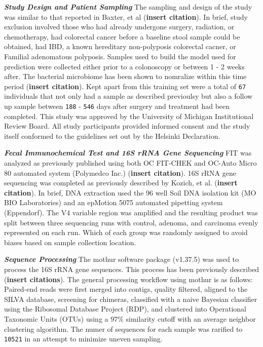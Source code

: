 \documentclass[12pt,]{article}
\begin{document}
\textbf{\emph{Study Design and Patient Sampling}} The sampling and
design of the study was similar to that reported in Baxter, et al
(\textbf{insert citation}). In brief, study exclusion involved those who
had already undergone surgery, radiation, or chemotherapy, had
colorectal cancer before a baseline stool sample could be obtained, had
IBD, a known hereditary non-polyposis colorectal cacner, or Familial
adenomatous polyposis. Samples used to build the model used for
prediction were collected either prior to a colonoscopy or between 1 - 2
weeks after. The bacterial microbiome has been shown to nomralize within
this time period (\textbf{insert citation}). Kept apart from this
training set were a total of \texttt{67} individuals that not only had a
sample as described previoulsy but also a follow up sample between
\texttt{188} - \texttt{546} days after surgery and treatment had been
completed. This study was approved by the University of Michigan
Institutional Review Board. All study participants provided informed
consent and the study itself conformed to the guidelines set out by the
Helsinki Declaration.

\textbf{\emph{Fecal Immunochemical Test and 16S rRNA Gene Sequencing}}
FIT was analyzed as previously published using both OC FIT-CHEK and
OC-Auto Micro 80 automated system (Polymedco Inc.) (\textbf{insert
citation}). 16S rRNA gene sequencing was completed as previously
described by Kozich, et al. (\textbf{insert citation}). In brief, DNA
extraction used the 96 well Soil DNA isolation kit (MO BIO Laboratories)
and an epMotion 5075 automated pipetting system (Eppendorf). The V4
variable region was amplified and the resulting product was split
between three sequencing runs with control, adenoma, and carcinoma
evenly represented on each run. Which of each group was randomly
assigned to avoid biases based on sample collection location.

\textbf{\emph{Sequence Processing}} The mothur software package
(v1.37.5) was used to process the 16S rRNA gene sequences. This process
has been previously described (\textbf{insert citations}). The general
processing workflow using mothur is as follows: Paired-end reads were
first merged into contigs, quality filtered, aligned to the SILVA
database, screening for chimeras, classified with a naive Bayesian
classifier using the Ribosomal Database Project (RDP), and clustered
into Operational Taxonomic Units (OTUs) using a 97\% similarity cutoff
with an average neighbor clustering algorithm. The numer of sequences
for each sample was rarified to \texttt{10521} in an attempt to minimize
uneven sampling.
\end{document}

